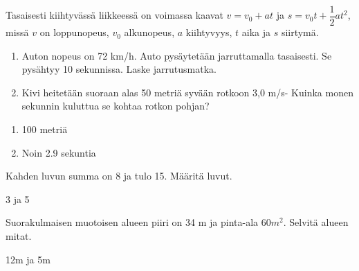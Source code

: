 \begin{tehtava}
    Tasaisesti kiihtyvässä liikkeessä on voimassa kaavat $v = v_0 + at$ ja $s = v_0t + \dfrac{1}{2}at^2$, missä $v$ on loppunopeus, $v_0$ alkunopeus, $a$ kiihtyvyys, $t$ aika ja $s$ siirtymä. 
		\begin{enumerate}
            \item Auton nopeus on 72 km/h. Auto pysäytetään jarruttamalla tasaisesti. Se pysähtyy 10 sekunnissa. Laske jarrutusmatka.
            \item Kivi heitetään suoraan alas 50 metriä syvään rotkoon 3,0 m/s- Kuinka monen sekunnin kuluttua se kohtaa rotkon pohjan?
        \end{enumerate}
    \begin{vastaus}
        \begin{enumerate}
            \item 100 metriä
            \item Noin 2.9 sekuntia
        \end{enumerate}
    \end{vastaus}
\end{tehtava}

\begin{tehtava}
    Kahden luvun summa on 8 ja tulo 15. Määritä luvut. 
    \begin{vastaus}
		3 ja 5
    \end{vastaus}
\end{tehtava}

\begin{tehtava}
    Suorakulmaisen muotoisen alueen piiri on 34 m ja pinta-ala 60$m^2$. Selvitä alueen mitat. 
    \begin{vastaus}
		12m ja 5m
    \end{vastaus}
\end{tehtava}